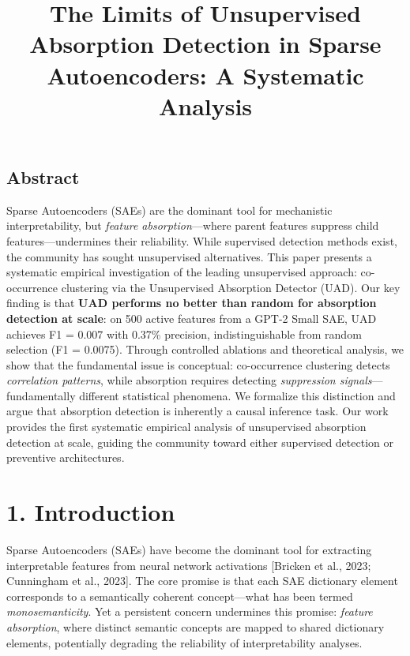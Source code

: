 \documentclass{article}
\begin{document}
\title{The Limits of Unsupervised Absorption Detection in Sparse Autoencoders: A Systematic Analysis}
\maketitle

\subsection{Abstract}

Sparse Autoencoders (SAEs) are the dominant tool for mechanistic interpretability, but \textit{feature absorption}---where parent features suppress child features---undermines their reliability. While supervised detection methods exist, the community has sought unsupervised alternatives. This paper presents a systematic empirical investigation of the leading unsupervised approach: co-occurrence clustering via the Unsupervised Absorption Detector (UAD). Our key finding is that \textbf{UAD performs no better than random for absorption detection at scale}: on 500 active features from a GPT-2 Small SAE, UAD achieves F1 = 0.007 with 0.37\% precision, indistinguishable from random selection (F1 = 0.0075). Through controlled ablations and theoretical analysis, we show that the fundamental issue is conceptual: co-occurrence clustering detects \textit{correlation patterns}, while absorption requires detecting \textit{suppression signals}---fundamentally different statistical phenomena. We formalize this distinction and argue that absorption detection is inherently a causal inference task. Our work provides the first systematic empirical analysis of unsupervised absorption detection at scale, guiding the community toward either supervised detection or preventive architectures.


\section{1. Introduction}

Sparse Autoencoders (SAEs) have become the dominant tool for extracting interpretable features from neural network activations [Bricken et al., 2023; Cunningham et al., 2023]. The core promise is that each SAE dictionary element corresponds to a semantically coherent concept---what has been termed \textit{monosemanticity}. Yet a persistent concern undermines this promise: \textit{feature absorption}, where distinct semantic concepts are mapped to shared dictionary elements, potentially degrading the reliability of interpretability analyses.
\end{document}
